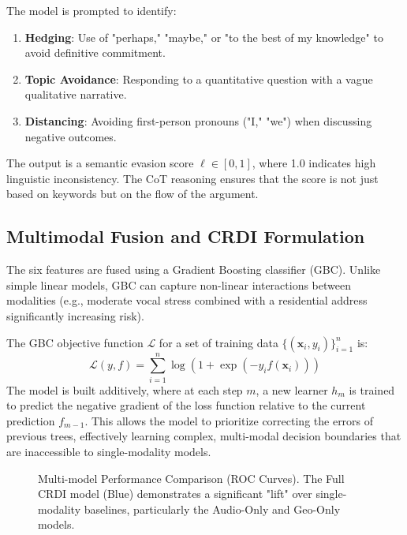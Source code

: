 \documentclass[conference]{IEEEtran}
\begin{document}
The model is prompted to identify:
\begin{enumerate}
    \item \textbf{Hedging}: Use of "perhaps," "maybe," or "to the best of my knowledge" to avoid definitive commitment.
    \item \textbf{Topic Avoidance}: Responding to a quantitative question with a vague qualitative narrative.
    \item \textbf{Distancing}: Avoiding first-person pronouns ("I," "we") when discussing negative outcomes.
\end{enumerate}

The output is a semantic evasion score $\ell \in [0, 1]$, where 1.0 indicates high linguistic inconsistency. The CoT reasoning ensures that the score is not just based on keywords but on the flow of the argument.

\subsection{Multimodal Fusion and CRDI Formulation}

The six features are fused using a Gradient Boosting classifier (GBC). Unlike simple linear models, GBC can capture non-linear interactions between modalities (e.g., moderate vocal stress combined with a residential address significantly increasing risk).

The GBC objective function $\mathcal{L}$ for a set of training data $\{(\mathbf{x}_i, y_i)\}_{i=1}^n$ is:
\begin{equation}
    \mathcal{L}(y, f) = \sum_{i=1}^n \log(1 + \exp(-y_i f(\mathbf{x}_i)))
\end{equation}
The model is built additively, where at each step $m$, a new learner $h_m$ is trained to predict the negative gradient of the loss function relative to the current prediction $f_{m-1}$. This allows the model to prioritize correcting the errors of previous trees, effectively learning complex, multi-modal decision boundaries that are inaccessible to single-modality models.

\begin{figure}[!t]
 \centering
 \fbox{\rule{0pt}{1.5in} \rule{0.9\columnwidth}{0pt}}
 \caption{Multi-model Performance Comparison (ROC Curves). The Full CRDI model (Blue) demonstrates a significant "lift" over single-modality baselines, particularly the Audio-Only and Geo-Only models.}
 \label{fig:roc_curves}
\end{figure}
\end{document}
